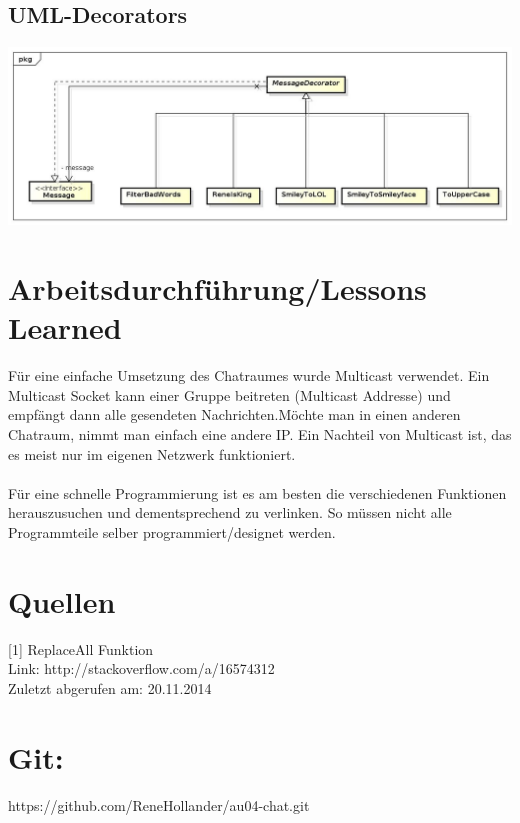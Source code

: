 \documentclass[a4paper, 11pt]{article}
\begin{document}
\newpage
\subsection{UML-Decorators}
\includegraphics[width=15.5cm]{Decorators}


\section{Arbeitsdurchführung/Lessons Learned}
Für eine einfache Umsetzung des Chatraumes wurde Multicast verwendet. Ein Multicast Socket kann einer Gruppe beitreten (Multicast Addresse) und empfängt dann alle gesendeten Nachrichten.Möchte man in einen anderen Chatraum, nimmt man einfach eine andere IP. Ein Nachteil von Multicast ist, das es meist nur im eigenen Netzwerk funktioniert.
\\\\
Für eine schnelle Programmierung ist es am besten die verschiedenen Funktionen herauszusuchen und dementsprechend zu verlinken.
So müssen nicht alle Programmteile selber programmiert/designet werden.



\section{Quellen}
[1] ReplaceAll Funktion \\
Link: http://stackoverflow.com/a/16574312 \\
Zuletzt abgerufen am: 20.11.2014 \\

\section{Git:}
https://github.com/ReneHollander/au04-chat.git
\end{document}
